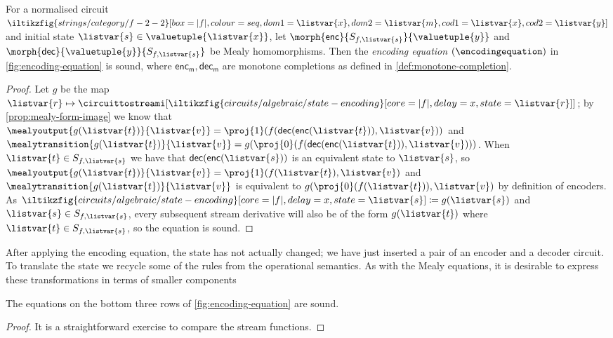 \begin{proposition}\label{prop:encoding-equation}
    For a normalised circuit \(
    \iltikzfig{strings/category/f-2-2}[box=|f|,colour=seq,dom1=\listvar{x},dom2=\listvar{m},cod1=\listvar{x},cod2=\listvar{y}]
    \) and initial state \(\listvar{s} \in \valuetuple{\listvar{x}}\), let
    \(\morph{\mathsf{enc}}{S_{f,\listvar{s}}}{\valuetuple{y}}\) and
    \(\morph{\mathsf{dec}}{\valuetuple{y}}{S_{f, \listvar{s}}}\) be Mealy
    homomorphisms.
    Then the \emph{encoding equation} \((\encodingequation)\) in
    \cref{fig:encoding-equation} is sound, where
    \(\mathsf{enc}_\mathsf{m},\mathsf{dec}_\mathsf{m}\) are monotone completions
    as defined in \cref{def:monotone-completion}.
\end{proposition}
\begin{proof}
    Let \(g\) be the map \(\listvar{r} \mapsto
    \circuittostreami[\iltikzfig{circuits/algebraic/state-encoding}[core=|f|,delay=x,state=\listvar{r}]]
    \); by \cref{prop:mealy-form-image} we know that \(
    \mealyoutput{g(\listvar{t})}{\listvar{v}}
    =
    \proj{1}(f(\mathsf{dec}(\mathsf{enc}(\listvar{t})), \listvar{v}))
    \) and \(
    \mealytransition{g(\listvar{t})}{\listvar{v}}
    =
    g(\proj{0}(f(\mathsf{dec}(\mathsf{enc}(\listvar{t})), \listvar{v})))
    \).
    When \(\listvar{t} \in S_{f, \listvar{s}}\) we have that \(
    \mathsf{dec}(\mathsf{enc}(\listvar{s}))\) is an equivalent state to
    \(\listvar{s}\),
    so
    \(
    \mealyoutput{g(\listvar{t})}{\listvar{v}}
    =
    \proj{1}(f(\listvar{t}), \listvar{v})
    \) and \(
    \mealytransition{g(\listvar{t})}{\listvar{v}}
    \) is equivalent to \(
    g(\proj{0}(f(\listvar{t})), \listvar{v})
    \) by definition of encoders.
    As \(
    \iltikzfig{circuits/algebraic/state-encoding}[core=|f|,delay=x,state=\listvar{s}]
    \coloneqq
    g(\listvar{s})
    \) and \(\listvar{s} \in S_{f,\listvar{s}}\),
    every subsequent stream derivative will also be of the form
    \(g(\listvar{t})\) where \(\listvar{t} \in S_{f,\listvar{s}}\), so the
    equation is sound.
\end{proof}

After applying the encoding equation, the state has not actually changed; we
have just inserted a pair of an encoder and a decoder circuit.
To translate the state we recycle some of the rules from the operational
semantics.
As with the Mealy equations, it is desirable to express these transformations in
terms of smaller components

\begin{lemma}
    The equations on the bottom three rows of \cref{fig:encoding-equation} are
    sound.
\end{lemma}
\begin{proof}
    It is a straightforward exercise to compare the stream functions.
\end{proof}


